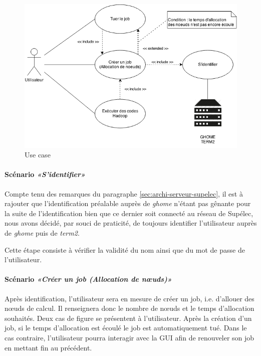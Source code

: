 \begin{figure}[h!]
  \centering
  \includegraphics[width=14cm]{images/use_case.png}
  \caption{Use case}
  \label{fig:use_case}
\end{figure}

\paragraph{Scénario \emph{«S’identifier»}}
\par Compte tenu des remarques du paragraphe \vref{sec:archi-serveur-supelec}, il est à rajouter que l'identification préalable auprès de \emph{ghome} n'étant pas gênante pour la suite de l'identification bien que ce dernier soit connecté au réseau de Supélec, nous avons décidé, par souci de praticité, de toujours identifier l'utilisateur auprès de \emph{ghome} puis de \emph{term2}.
\par Cette étape consiste à vérifier la validité du nom ainsi que du mot de passe de l’utilisateur.

\paragraph{Scénario \emph{«Créer un job (Allocation de nœuds)»}}
\label{sec:scenario-creer-un}
\par Après identification, l’utilisateur sera en mesure de créer un job, i.e. d’allouer des nœuds de calcul. Il renseignera donc le nombre de nœuds et le temps d’allocation souhaités. Deux cas de figure se présentent à l'utilisateur. Après la création d’un job, si le temps d’allocation est écoulé le job est automatiquement tué. Dans le cas contraire, l’utilisateur pourra interagir avec la GUI afin de renouveler son job en mettant fin au précédent.

